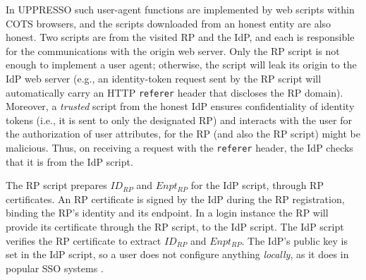 In UPPRESSO such user-agent functions are implemented by web scripts within COTS browsers,
and the scripts downloaded from an honest entity are also honest.
Two scripts are from the visited RP and the IdP, %
    and each is responsible for the communications with the origin web server.
Only the RP script is not enough to implement a user agent;
    otherwise, the script will leak its origin to the IdP web server
    (e.g.,
    an identity-token request sent by the RP script will
automatically carry an HTTP \verb+referer+ header that discloses the RP domain).
Moreover, a \emph{trusted} script from the honest IdP
ensures confidentiality of identity tokens (i.e., it is sent to only the designated RP)
and interacts with the user for the authorization of user attributes,
    for the RP (and also the RP script) might be malicious.
Thus, on receiving a request with the \verb+referer+ header,
    the IdP checks that it is from the IdP script.

The RP script prepares $ID_{RP}$ and $Enpt_{RP}$ for the IdP script, through RP certificates.
An RP certificate is signed by the IdP during the RP registration,
     binding the RP's identity and its endpoint. %
In a login instance
    the RP will provide its certificate through the RP script, to the IdP script.
The IdP script %
    verifies the RP certificate to extract $ID_{RP}$ and $Enpt_{RP}$.
The IdP's public key is set in the IdP script, so
 a user does not configure anything \emph{locally},
    as it does in popular SSO systems \cite{OpenIDConnect, rfc6749, SAML,SAMLIdentifier}.



